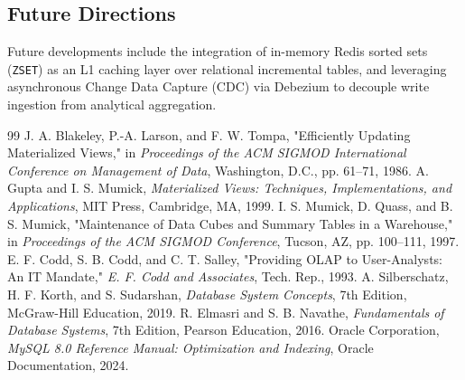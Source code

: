 \documentclass[11pt,a4paper]{report}
\begin{document}
\subsection{Future Directions}
Future developments include the integration of in-memory Redis sorted sets (\texttt{ZSET}) as an L1 caching layer over relational incremental tables, and leveraging asynchronous Change Data Capture (CDC) via Debezium to decouple write ingestion from analytical aggregation.


\begin{thebibliography}{99}
     J. A. Blakeley, P.-A. Larson, and F. W. Tompa, "Efficiently Updating Materialized Views," in \textit{Proceedings of the ACM SIGMOD International Conference on Management of Data}, Washington, D.C., pp. 61--71, 1986.
     A. Gupta and I. S. Mumick, \textit{Materialized Views: Techniques, Implementations, and Applications}, MIT Press, Cambridge, MA, 1999.
     I. S. Mumick, D. Quass, and B. S. Mumick, "Maintenance of Data Cubes and Summary Tables in a Warehouse," in \textit{Proceedings of the ACM SIGMOD Conference}, Tucson, AZ, pp. 100--111, 1997.
     E. F. Codd, S. B. Codd, and C. T. Salley, "Providing OLAP to User-Analysts: An IT Mandate," \textit{E. F. Codd and Associates}, Tech. Rep., 1993.
     A. Silberschatz, H. F. Korth, and S. Sudarshan, \textit{Database System Concepts}, 7th Edition, McGraw-Hill Education, 2019.
     R. Elmasri and S. B. Navathe, \textit{Fundamentals of Database Systems}, 7th Edition, Pearson Education, 2016.
     Oracle Corporation, \textit{MySQL 8.0 Reference Manual: Optimization and Indexing}, Oracle Documentation, 2024.
\end{thebibliography}
\end{document}
